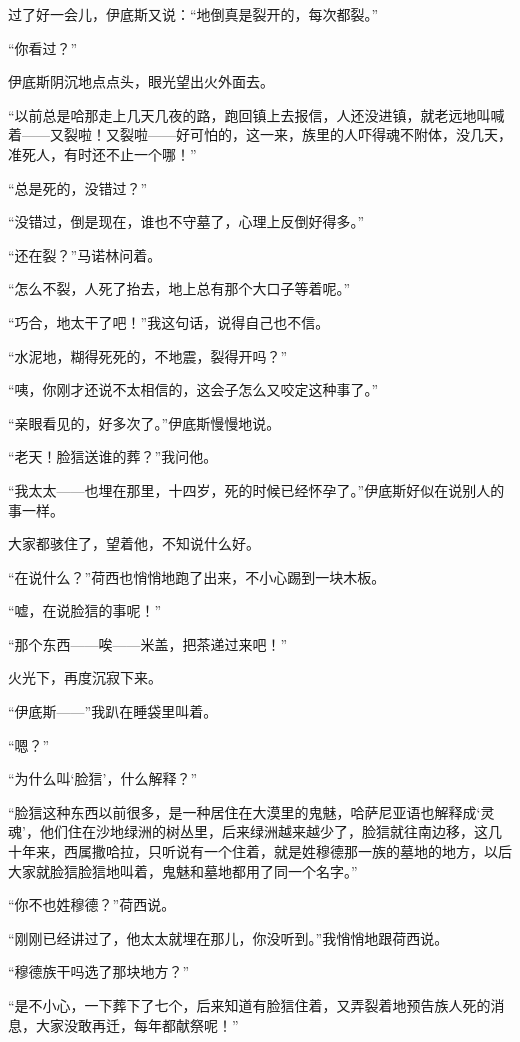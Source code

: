 \par 过了好一会儿，伊底斯又说：“地倒真是裂开的，每次都裂。”
\par “你看过？”
\par 伊底斯阴沉地点点头，眼光望出火外面去。
\par “以前总是哈那走上几天几夜的路，跑回镇上去报信，人还没进镇，就老远地叫喊着——又裂啦！又裂啦——好可怕的，这一来，族里的人吓得魂不附体，没几天，准死人，有时还不止一个哪！”
\par “总是死的，没错过？”
\par “没错过，倒是现在，谁也不守墓了，心理上反倒好得多。”
\par “还在裂？”马诺林问着。
\par “怎么不裂，人死了抬去，地上总有那个大口子等着呢。”
\par “巧合，地太干了吧！”我这句话，说得自己也不信。
\par “水泥地，糊得死死的，不地震，裂得开吗？”
\par “咦，你刚才还说不太相信的，这会子怎么又咬定这种事了。”
\par “亲眼看见的，好多次了。”伊底斯慢慢地说。
\par “老天！脸狺送谁的葬？”我问他。
\par “我太太——也埋在那里，十四岁，死的时候已经怀孕了。”伊底斯好似在说别人的事一样。
\par 大家都骇住了，望着他，不知说什么好。
\par “在说什么？”荷西也悄悄地跑了出来，不小心踢到一块木板。
\par “嘘，在说脸狺的事呢！”
\par “那个东西——唉——米盖，把茶递过来吧！”
\par 火光下，再度沉寂下来。
\par “伊底斯——”我趴在睡袋里叫着。
\par “嗯？”
\par “为什么叫‘脸狺’，什么解释？”
\par “脸狺这种东西以前很多，是一种居住在大漠里的鬼魅，哈萨尼亚语也解释成‘灵魂’，他们住在沙地绿洲的树丛里，后来绿洲越来越少了，脸狺就往南边移，这几十年来，西属撒哈拉，只听说有一个住着，就是姓穆德那一族的墓地的地方，以后大家就脸狺脸狺地叫着，鬼魅和墓地都用了同一个名字。”
\par “你不也姓穆德？”荷西说。
\par “刚刚已经讲过了，他太太就埋在那儿，你没听到。”我悄悄地跟荷西说。
\par “穆德族干吗选了那块地方？”
\par “是不小心，一下葬下了七个，后来知道有脸狺住着，又弄裂着地预告族人死的消息，大家没敢再迁，每年都献祭呢！”
